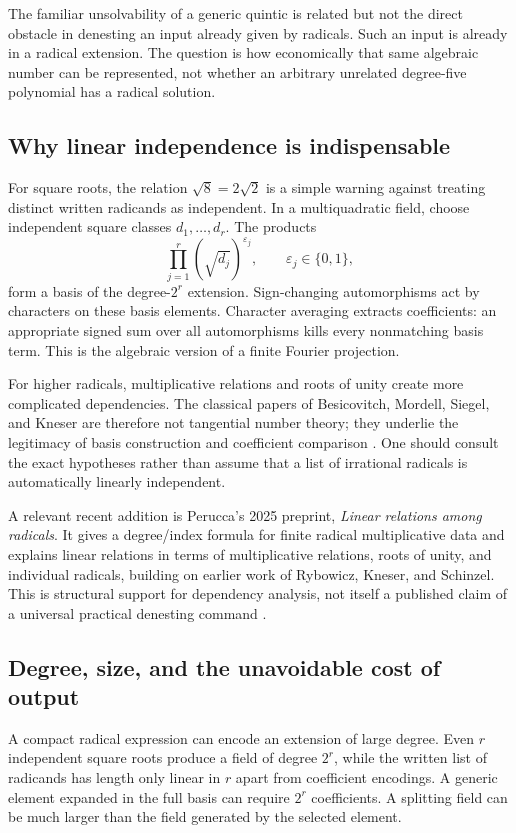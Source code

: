 \documentclass[11pt,letterpaper]{article}
\numberwithin{equation}{section}
\theoremstyle{definition}
\theoremstyle{remark}
\begin{document}
The familiar unsolvability of a generic quintic is related but not the direct obstacle in denesting an input already given by radicals. Such an input is already in a radical extension. The question is how economically that same algebraic number can be represented, not whether an arbitrary unrelated degree-five polynomial has a radical solution.

\subsection{Why linear independence is indispensable}
For square roots, the relation $\sqrt8=2\sqrt2$ is a simple warning against treating distinct written radicands as independent. In a multiquadratic field, choose independent square classes $d_1,\ldots,d_r$. The products
\[
\prod_{j=1}^r(\sqrt{d_j})^{\varepsilon_j},\qquad
\varepsilon_j\in\{0,1\},
\]
form a basis of the degree-$2^r$ extension. Sign-changing automorphisms act by characters on these basis elements. Character averaging extracts coefficients: an appropriate signed sum over all automorphisms kills every nonmatching basis term. This is the algebraic version of a finite Fourier projection.

For higher radicals, multiplicative relations and roots of unity create more complicated dependencies. The classical papers of Besicovitch, Mordell, Siegel, and Kneser are therefore not tangential number theory; they underlie the legitimacy of basis construction and coefficient comparison \cite{besicovitch,mordell,siegel,kneser}. One should consult the exact hypotheses rather than assume that a list of irrational radicals is automatically linearly independent.

A relevant recent addition is Perucca's 2025 preprint, \emph{Linear relations among radicals}. It gives a degree/index formula for finite radical multiplicative data and explains linear relations in terms of multiplicative relations, roots of unity, and individual radicals, building on earlier work of Rybowicz, Kneser, and Schinzel. This is structural support for dependency analysis, not itself a published claim of a universal practical denesting command \cite{perucca}.

\subsection{Degree, size, and the unavoidable cost of output}
A compact radical expression can encode an extension of large degree. Even $r$ independent square roots produce a field of degree $2^r$, while the written list of radicands has length only linear in $r$ apart from coefficient encodings. A generic element expanded in the full basis can require $2^r$ coefficients. A splitting field can be much larger than the field generated by the selected element.
\end{document}
